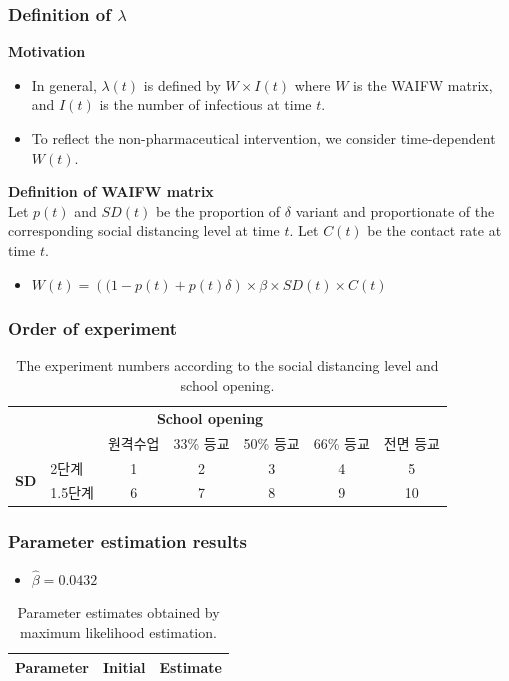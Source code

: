 \documentclass[aspectratio=169, 9pt, xcolor=dvipsnames]{beamer}
\begin{document}
	\begin{frame}\frametitle{Definition of $\lambda$}
		\textbf{Motivation}
	    \begin{itemize}
	    	\item In general, $\lambda(t)$ is defined by $W \times I(t)$ where $W$ is the WAIFW matrix, and $I(t)$ is the number of infectious at time $t$.
	    	\item To reflect the non-pharmaceutical intervention, we consider time-dependent $W(t)$.
	    \end{itemize}
	    \vspace{0.5cm}
	    \textbf{Definition of WAIFW matrix} \\
	    Let $p(t)$ and $SD(t)$ be the proportion of $\delta$ variant and proportionate of the corresponding social distancing level at time $t$. Let $C(t)$ be the contact rate at time $t$.
	    \begin{itemize}
	    	\item $W(t) = \left((1 - p(t) + p(t) \delta\right) \times \beta \times SD(t) \times C(t)$
	    \end{itemize}
	\end{frame}

	\begin{frame}\frametitle{Order of experiment}
		\begin{table}
			\begin{tabular}{clccccc}
				\toprule
				& \multicolumn{5}{c}{\textbf{School opening}} \\
				\cmidrule{3-7}
				&  & 원격수업 & 33\% 등교 & 50\% 등교 & 66\% 등교 & 전면 등교 \\
				\midrule
				\multirow{2}{*}{\textbf{SD}\footnotemark[3]} & 2단계 & 1 & 2 & 3 & 4 & 5 \\
				& 1.5단계 & 6 & 7 & 8 & 9 & 10 \\
				\bottomrule
			\end{tabular}
			\caption{The experiment numbers according to the social distancing level and school opening.}
		\end{table}
	\end{frame}

	\begin{frame}\frametitle{Parameter estimation results}
		\begin{itemize}
			\item $\hat{\beta} = 0.0432$
		\end{itemize}
	    \begin{table}
	    	\begin{tabular}{crr}
	    		\toprule
	    		\textbf{Parameter} & \textbf{Initial} & \textbf{Estimate} \\
	    		\midrule
	    		
	    		\bottomrule
	    	\end{tabular}
	    	\caption{Parameter estimates obtained by maximum likelihood estimation.}
	    \end{table}
	\end{frame}
\end{document}
